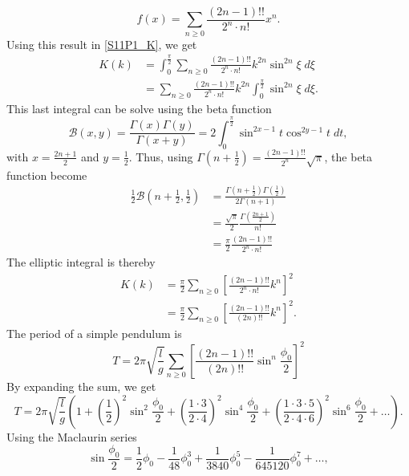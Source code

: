 \begin{problem}[title={Pendulum period as a function of amplitude}]
{\begin{equation*}
    f(x) = \sum_{n\geq0}\frac{(2n-1)!!}{2^n \cdot n!}x^n.
\end{equation*}
Using this result in \eqref{S11P1_K}, we get
\begin{align*}
    K(k) &= \int_{0}^{\frac{\pi}{2}} \sum_{n\geq0}\frac{(2n-1)!!}{2^n \cdot n!}k^{2n}\sin^{2n}{\xi}\;d\xi \\
    &= \sum_{n\geq0}\frac{(2n-1)!!}{2^n \cdot n!}k^{2n} \int_{0}^{\frac{\pi}{2}} \sin^{2n}{\xi}\;d\xi.
\end{align*}
This last integral can be solve using the beta function
\begin{equation*}
    \mathcal{B}(x,y) = \frac{\Gamma(x)\Gamma(y)}{\Gamma(x+y)} = 2\int_0^{\frac{\pi}{2}} \sin^{2x-1}{t}\cos^{2y-1}{t}\;dt,
\end{equation*}
with $x=\frac{2n+1}{2}$ and $y=\frac{1}{2}$. Thus, using $\Gamma\left(n+\frac{1}{2}\right) = \frac{(2n-1)!!}{2^n}\sqrt{\pi}$, the beta function become
\begin{align*}
    \frac{1}{2}\mathcal{B}\left(n+\frac{1}{2},\frac{1}{2}\right) &= \frac{\Gamma(n+\frac{1}{2})\Gamma(\frac{1}{2})}{2\Gamma(n+1)} \\
    &= \frac{\sqrt{\pi}}{2}\frac{\Gamma(\frac{2n+1}{2})}{n!} \\
    &= \frac{\pi}{2}\frac{(2n-1)!!}{2^n \cdot n!}
\end{align*}
The elliptic integral is thereby
\begin{align*}
    K(k) &= \frac{\pi}{2} \sum_{n\geq0}\left[\frac{(2n-1)!!}{2^n \cdot n!}k^{n}\right]^2 \\
    &= \frac{\pi}{2} \sum_{n\geq0}\left[\frac{(2n-1)!!}{(2n)!!}k^{n}\right]^2.
\end{align*}
The period of a simple pendulum is
\begin{equation*}
    T = 2\pi\sqrt{\frac{l}{g}}\sum_{n\geq0}\left[\frac{(2n-1)!!}{(2n)!!}\sin^n{\frac{\phi_0}{2}}\right]^2
\end{equation*}
By expanding the sum, we get
\begin{equation*}
    T = 2\pi\sqrt{\frac{l}{g}}\left( 1 + \left(\frac{1}{2}\right)^2\sin^2{\frac{\phi_0}{2}} + \left(\frac{1\cdot3}{2\cdot4}\right)^2\sin^4{\frac{\phi_0}{2}} + \left(\frac{1\cdot3\cdot5}{2\cdot4\cdot6}\right)^2\sin^6{\frac{\phi_0}{2}} + \ldots \right).
\end{equation*}
Using the Maclaurin series
\begin{equation*}
    \sin{\frac{\phi_0}{2}} = \frac{1}{2}\phi_0 - \frac{1}{48}\phi_0^3 + \frac{1}{3840}\phi_0^5 - \frac{1}{645120}\phi_0^7 + \ldots,

\end{equation*}}
\end{problem}
